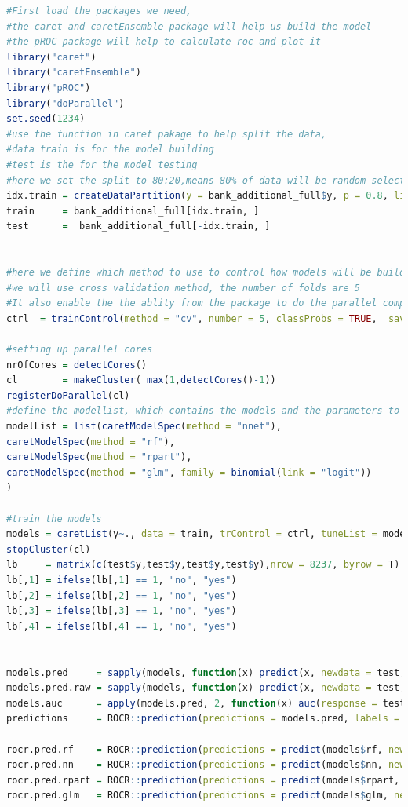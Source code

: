 \documentclass[12pt, a4paper, bibliography=totoc, english]{scrartcl}
\begin{document}
\begin{lstlisting}[language = R]
#First load the packages we need, 
#the caret and caretEnsemble package will help us build the model
#the pROC package will help to calculate roc and plot it
library("caret") 
library("caretEnsemble")
library("pROC") 
library("doParallel")
set.seed(1234)
#use the function in caret pakage to help split the data,
#data train is for the model building
#test is the for the model testing
#here we set the split to 80:20,means 80% of data will be random select as train data, 20% will be test data
idx.train = createDataPartition(y = bank_additional_full$y, p = 0.8, list = FALSE)
train     = bank_additional_full[idx.train, ]
test      =  bank_additional_full[-idx.train, ]


#here we define which method to use to control how models will be build
#we will use cross validation method, the number of folds are 5
#It also enable the the ablity from the package to do the parallel computing
ctrl  = trainControl(method = "cv", number = 5, classProbs = TRUE,  savePredictions = "final", summaryFunction = twoClassSummary, allowParallel = TRUE)

#setting up parallel cores
nrOfCores = detectCores()
cl        = makeCluster( max(1,detectCores()-1))
registerDoParallel(cl)
#define the modellist, which contains the models and the parameters to use,here we jsut set all the parameter to default
modelList = list(caretModelSpec(method = "nnet"),
caretModelSpec(method = "rf"),
caretModelSpec(method = "rpart"),
caretModelSpec(method = "glm", family = binomial(link = "logit"))
) 

#train the models
models = caretList(y~., data = train, trControl = ctrl, tuneList = modelList, continue_on_fail = F)
stopCluster(cl)
lb     = matrix(c(test$y,test$y,test$y,test$y),nrow = 8237, byrow = T)
lb[,1] = ifelse(lb[,1] == 1, "no", "yes")
lb[,2] = ifelse(lb[,2] == 1, "no", "yes")
lb[,3] = ifelse(lb[,3] == 1, "no", "yes")
lb[,4] = ifelse(lb[,4] == 1, "no", "yes")


models.pred     = sapply(models, function(x) predict(x, newdata = test, type = "prob")[,2])
models.pred.raw = sapply(models, function(x) predict(x, newdata = test, type = "raw"))
models.auc      = apply(models.pred, 2, function(x) auc(response = test$y, predictor = x))
predictions     = ROCR::prediction(predictions = models.pred, labels = lb)

rocr.pred.rf    = ROCR::prediction(predictions = predict(models$rf, newdata = test, type = "prob")[,2], labels = test$y)
rocr.pred.nn    = ROCR::prediction(predictions = predict(models$nn, newdata = test, type = "prob")[,2], labels = test$y)
rocr.pred.rpart = ROCR::prediction(predictions = predict(models$rpart, newdata = test, type = "prob")[,2], labels = test$y)
rocr.pred.glm   = ROCR::prediction(predictions = predict(models$glm, newdata = test, type = "prob")[,2], labels = test$y)


\end{lstlisting}
\end{document}
